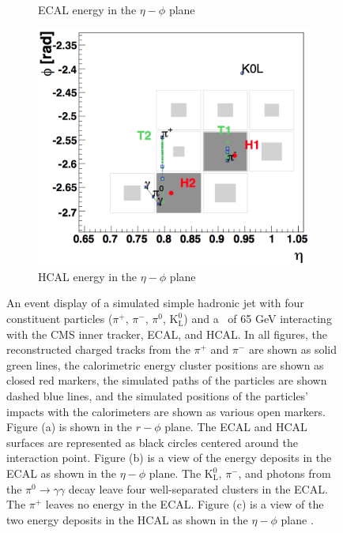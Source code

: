 \begin{figure}
\begin{subfigure}[b]{0.44\textwidth}
    \caption{ECAL energy in the $\eta-\phi$ plane}
    \label{fig:pf-2}
  \end{subfigure}
  \begin{subfigure}[b]{0.44\textwidth}
    \includegraphics[width=\textwidth]{tex/reco/fig/reco-pf-3.png}
    \caption{HCAL energy in the $\eta-\phi$ plane}
    \label{fig:pf-3}
  \end{subfigure}
  \caption{
    An event display of a simulated simple hadronic jet with four 
    constituent particles ($\pi^+$, $\pi^-$, $\pi^0$, $\text{K}_{\text{L}}^0$)
    and a \pt~of 65 GeV interacting with the CMS inner tracker, ECAL, and HCAL.
    In all figures, 
    the reconstructed charged tracks from the $\pi^+$ and $\pi^-$ are shown as solid green lines, 
    the calorimetric energy cluster positions are shown as closed red markers,
    the simulated paths of the particles are shown dashed blue lines, and 
    the simulated positions of the particles' impacts with the calorimeters are shown as various open markers.  
    Figure (a) is shown in the $r-\phi$ plane.  The ECAL and HCAL surfaces are
    represented as black circles centered around the interaction point.
    Figure (b) is a view of the energy deposits in the ECAL as shown in the 
    $\eta-\phi$ plane.  The $\text{K}_{\text{L}}^0$,
    $\pi^-$, and photons from the $\pi^0 \rightarrow \gamma\gamma$ decay leave
    four well-separated clusters in the ECAL.  The $\pi^+$ leaves no energy
    in the ECAL.
    Figure (c) is a view of the two energy deposits in the HCAL as shown in the
    $\eta-\phi$ plane
    \cite{pf-1}.
  }
  \label{fig:pf}
\end{figure}


